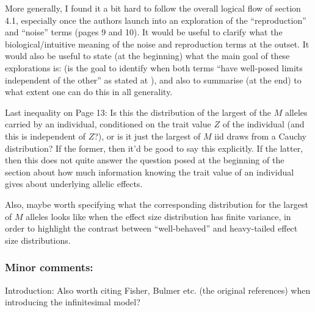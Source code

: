 \reply{
}

\begin{point}{}
More generally, I found it a bit hard to follow the overall logical flow of section 4.1, especially once the authors launch into an exploration of the ``reproduction'' and ``noise'' terms (pages 9 and 10).
    It would be useful to clarify what the biological/intuitive meaning of the noise and reproduction terms at the outset. It would also be useful to state (at the beginning) what the main goal of these explorations is: (is the goal to identify when both terms ``have well-posed limits independent of the other'' as stated at ), and also to summarise (at the end) to what extent one can do this in all generality.
\end{point}

\reply{
}


\begin{point}{}
    Last inequality on Page 13: Is this the distribution of the largest of the $M$ alleles carried by an individual, conditioned on the trait value $Z$ of the individual (and this is independent of $Z$?), or is it just the largest of $M$ iid draws from a Cauchy distribution? If the former, then it'd be good to say this explicitly. If the latter, then this does not quite answer the question posed at the beginning of the section about how much information knowing the trait value of an individual gives about underlying allelic effects.
\end{point}

\reply{
}

\begin{point}{}
Also, maybe worth specifying what the corresponding distribution for the largest of $M$ alleles looks like when the effect size distribution has finite variance, in order to highlight the contrast between ``well-behaved'' and heavy-tailed effect size distributions.
\end{point}

\reply{
}

\subsubsection*{Minor comments:}

\begin{point}{}
    Introduction: Also worth citing Fisher, Bulmer etc. (the original references) when introducing the infinitesimal model?
\end{point}

